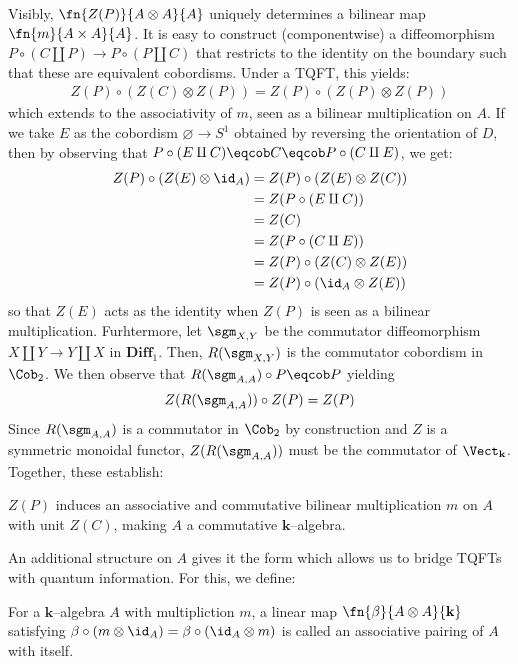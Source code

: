 Visibly, $\fn{Z(P)}{A \otimes A}{A}$ uniquely determines a bilinear map
$\fn{m}{A \times A}{A}$. It is easy to construct (componentwise) a
diffeomorphism $P \circ (C \amalg P) \to P \circ (P \amalg C)$ that restricts
to the identity on the boundary such that these are equivalent cobordisms. Under
a TQFT, this yields:
\begin{align*}
  Z(P) \circ (Z(C) \otimes Z(P)) = Z(P) \circ (Z(P) \otimes Z(P))
\end{align*}
which extends to the associativity of $m$, seen as a bilinear multiplication on
$A$. If we take $E$ as the cobordism $\varnothing \to S^1$ obtained by reversing
the orientation of $D$, then by observing that
$P \circ (E \amalg C) \eqcob C \eqcob P \circ (C \amalg E)$, we get:
\begin{align*}
  Z(P) \circ (Z(E) \otimes \id_{A})
    &= Z(P) \circ (Z(E) \otimes Z(C))\\
    &= Z(P \circ (E \amalg C))\\
    &= Z(C)\\
    &= Z(P \circ (C \amalg E))\\
    &= Z(P) \circ (Z(C) \otimes Z(E))\\
    &= Z(P) \circ (\id_{A} \otimes Z(E))
\end{align*}
so that $Z(E)$ acts as the identity when $Z(P)$ is seen as a bilinear
multiplication. Furhtermore, let $\sgm_{X, Y}$ be the commutator diffeomorphism
$X \amalg Y \to Y \amalg X$ in $\textbf{Diff}_{1}$. Then, $R(\sgm_{X, Y})$ is
the commutator cobordism in $\Cob_2$. We then observe that
$R(\sgm_{A, A}) \circ P \eqcob P$ yielding
\[
  Z(R(\sgm_{A, A})) \circ Z(P) = Z(P)
\]
Since $R(\sgm_{A, A})$ is a commutator in $\Cob_2$ by construction and $Z$ is a
symmetric monoidal functor, $Z(R(\sgm_{A, A}))$ must be the commutator of
$\Vect_{\mathbf{k}}$. Together, these establish:

\begin{thm}
$Z(P)$ induces an associative and commutative bilinear multiplication $m$ on $A$
with unit $Z(C)$, making $A$ a commutative $\mathbf{k}$--algebra.
\end{thm}

An additional structure on $A$ gives it the form which allows us to bridge TQFTs
with quantum information. For this, we define:
\begin{defn}
For a $\mathbf{k}$--algebra $A$ with multipliction $m$, a linear map
$\fn{\beta}{A \otimes A}{\mathbf{k}}$ satisfying $\beta \circ (m \otimes \id_A)
= \beta \circ (\id_A \otimes m)$ is called an associative pairing of $A$ with
itself.
\end{defn}

